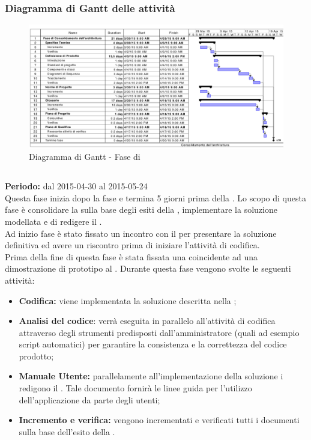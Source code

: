\subsubsection{Diagramma di Gantt delle attività}
\begin{figure}[h]
\centering
\includegraphics[width=\textwidth,keepaspectratio]{../immagini/gantt/consolidamentoArchitetturaP.png}
\caption{Diagramma di Gantt - Fase di \fPDt}\label{fig:ganttFPD}
\end{figure}
\FloatBarrier
\subsection{\fCt}\label{cod}
\textbf{Periodo:} dal 2015-04-30 al 2015-05-24 \\
Questa fase inizia dopo la fase \fPD e termina 5 giorni prima della \RQ.
Lo scopo di questa fase è consolidare la \DP sulla base degli esiti della \RP, implementare la soluzione modellata e di redigere il \MU. \\
Ad inizio fase è stato fissato un incontro con il  per presentare la soluzione definitiva ed avere un riscontro prima di iniziare l'attività di codifica. \\
Prima della fine di questa fase è stata fissata una  coincidente ad una dimostrazione di prototipo al .
Durante questa fase vengono svolte le seguenti attività:
\begin{itemize}
\item \textbf{Codifica:} viene implementata la soluzione descritta nella \DP;
\item \textbf{Analisi del codice}: verrà eseguita in parallelo all'attività di codifica attraverso degli strumenti predisposti dall'amministratore (quali ad esempio script automatici) per garantire la consistenza e la correttezza del codice prodotto;
\item \textbf{Manuale Utente:} parallelamente all'implementazione della soluzione i \rps redigono il \MU. Tale documento fornirà le linee guida per l'utilizzo dell'applicazione da parte degli utenti;
\item \textbf{Incremento e verifica:} vengono incrementati e verificati tutti i documenti sulla base dell'esito della \RP.
\end{itemize}
\newpage
